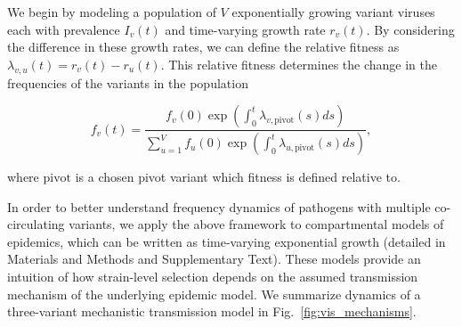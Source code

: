 \documentclass[12pt,oneside,letterpaper]{article}
\begin{document}
We begin by modeling a population of $V$ exponentially growing variant viruses each with prevalence $I_v(t)$ and time-varying growth rate $r_v(t)$.
By considering the difference in these growth rates, we can define the relative fitness as $\lambda_{v, u}(t) = r_v(t) - r_u(t)$.
This relative fitness determines the change in the frequencies of the variants in the population

\begin{equation}
    f_v(t) = \frac{f_v(0) \exp \left( \int_0^t \lambda_{v, \text{pivot}}(s)ds \right)}{ \sum_{u=1}^{V} f_u(0) \exp \left( \int_0^t \lambda_{u, \text{pivot}}(s)ds \right)},
\end{equation}

where $\text{pivot}$ is a chosen pivot variant which fitness is defined relative to.

In order to better understand frequency dynamics of pathogens with multiple co-circulating variants, we apply the above framework to compartmental models of epidemics, which can be written as time-varying exponential growth (detailed in Materials and Methods and Supplementary Text).
These models provide an intuition of how strain-level selection depends on the assumed transmission mechanism of the underlying epidemic model.
We summarize dynamics of a three-variant mechanistic transmission model in Fig.~\ref{fig:vis_mechanisms}.
\end{document}
